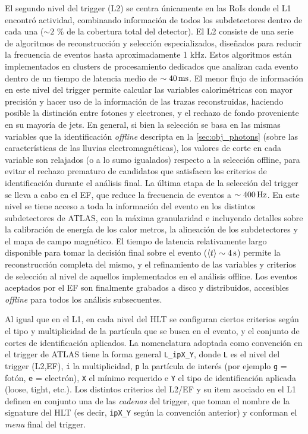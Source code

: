El segundo nivel del trigger (L2) se centra únicamente en las RoIs donde el L1
encontró actividad, combinando información de todos los subdetectores dentro de
cada una ($\sim 2$ \% de la cobertura total del detector). El L2 consiste de una
serie de algoritmos de reconstrucción y selección especializados, dise\~nados
para reducir la frecuencia de eventos hasta aproximadamente 1 kHz. Estos
algoritmos están implementados en clusters de procesamiento dedicados
que analizan cada evento dentro de un tiempo de latencia medio de $\sim
\unit[40]{ms}$. El menor flujo de información en este nivel del trigger permite
calcular las variables calorimétricas con mayor precisión y hacer uso de la
información de las trazas reconstruidas, haciendo posible la distinción entre
fotones y electrones, y el rechazo de fondo proveniente en su mayoría de jets.
En general, si bien la selección se basa en las mismas variables que la
identificación \emph{offline} descripta en la \cref{sec:obj_photons} (sobre las características de
las lluvias electromagnéticas), los valores de corte en cada variable son
relajados (o a lo sumo igualados) respecto a la selección offline, para evitar
el rechazo prematuro de candidatos que satisfacen los criterios de identificación
durante el análisis final. La última etapa de la selección del trigger se lleva
a cabo en el EF, que reduce la frecuencia de eventos a $\sim \unit[400]{Hz}$.
En este nivel se tiene acceso a toda
la información del evento en los distintos subdetectores de ATLAS, con la máxima
granularidad e incluyendo detalles sobre la calibración de energía de los
calor metros, la alineación de los subdetectores y el mapa de campo magnético. El
tiempo de latencia relativamente largo disponible para tomar la decisión final
sobre el evento ($\avg{t} \sim \unit[4]{s}$) permite la reconstrucción completa
del mismo, y el refinamiento de las variables y criterios de selección al nivel
de aquellos implementados en el análisis offline. Los eventos aceptados por el
EF son finalmente grabados a disco y distribuidos, accesibles \emph{offline} para todos
los análisis subsecuentes.

Al igual que en el L1, en cada nivel del HLT se configuran ciertos
criterios según el tipo y multiplicidad de la partícula que se busca en el
evento, y el conjunto de cortes de identificación aplicados. La nomenclatura
adoptada como convención en el trigger de ATLAS tiene la forma general
\texttt{L\_ipX\_Y}, donde \texttt{L} es el nivel del trigger (L2,EF), \texttt{i}
la multiplicidad, \texttt{p} la partícula de interés (por ejemplo
\texttt{g} = fotón, \texttt{e} = electrón), \texttt{X} el {\pt} mínimo requerido e
\texttt{Y} el tipo de identificación aplicada (loose, tight, etc.). Los
distintos criterios del L2/EF y su item asociado en el L1 definen en conjunto
una de las \emph{cadenas} del trigger, que toman el nombre de la signature del
HLT (es decir,  \texttt{ipX\_Y} según la convención anterior) y conforman el \emph{menu} final
del trigger.

